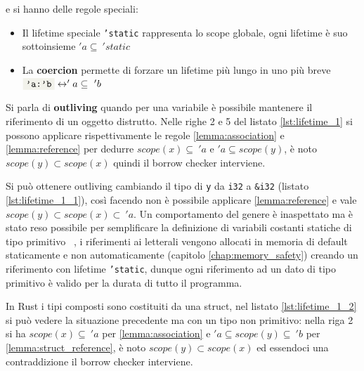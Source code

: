 \documentclass[Lau,binding=0.6cm]{sapthesis}
\newcommand{\textcode}[1]{\colorbox{backcolour}{\texttt{#1}}}
\begin{document}

e si hanno delle regole speciali:
\begin{itemize}
    \item Il lifetime speciale \textcode{'static} rappresenta lo scope globale, ogni lifetime è suo sottoinsieme $ 'a \subseteq \ 'static $
    \item La \textbf{coercion} permette di forzare un lifetime più lungo in uno più breve $ \textnormal{\textcode{'a:'b}} \leftrightarrow 'a \subseteq \ 'b $
\end{itemize}

Si parla di \textbf{outliving} quando per una variabile è possibile mantenere il riferimento di un oggetto distrutto. 
Nelle righe 2 e 5 del listato \ref{lst:lifetime_1} si possono applicare rispettivamente le regole \ref{lemma:association} e \ref{lemma:reference} per dedurre $ scope(x) \subseteq \ 'a $ e $ 'a \subseteq scope(y) $, è noto $ scope(y) \subset scope(x) $ quindi il borrow checker interviene.




Si può ottenere outliving cambiando il tipo di \textcode{y} da \textcode{i32} a \textcode{\&i32} (listato \ref{lst:lifetime_1_1}), così facendo non è possibile applicare \ref{lemma:reference} e vale $ scope(y) \subset scope(x) \subset \ 'a $. 
Un comportamento del genere è inaspettato ma è stato reso possibile per semplificare la definizione di variabili costanti statiche di tipo primitivo ~\cite{git:outliving_static}, i riferimenti ai letterali vengono allocati in memoria di default staticamente e non automaticamente (capitolo \ref{chap:memory_safety}) creando un riferimento con lifetime \textcode{'static}, dunque ogni riferimento ad un dato di tipo primitivo è valido per la durata di tutto il programma.




In Rust i tipi composti sono costituiti da una struct, nel listato \ref{lst:lifetime_1_2} si può vedere la situazione precedente ma con un tipo non primitivo: nella riga 2 si ha $ scope(x) \subseteq \ 'a $ per \ref{lemma:association} e $ 'a \subseteq scope(y) \subseteq \ 'b$ per \ref{lemma:struct_reference}, è noto $ scope(y) \subset scope(x) $ ed essendoci una contraddizione il borrow checker interviene.  
\end{document}
